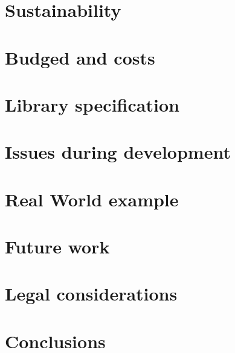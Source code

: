 \documentclass[11pt,a4paper,titlepage]{article}
\begin{document}
    \section{Sustainability}
    
    \section{Budged and costs}
    
    \section{Library specification}
    
    \section{Issues during development}
    
    \section{Real World example}
    
    \section{Future work}
    
    \section{Legal considerations}
    
    \section{Conclusions}
    
    
	\newpage
    
	
    
    
\end{document}
